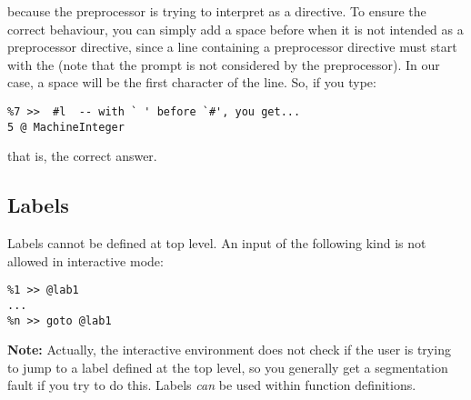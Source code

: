 because the preprocessor is trying to interpret  as a directive.
To ensure the correct behaviour, you can simply add a space before
\ttin{\#} when it is not intended as a preprocessor directive, since a
line containing a preprocessor directive must start with the \ttin{\#}
(note that the prompt is not considered by the preprocessor).  In our
case, a space will be the first character of the line.  So, if you type:

{\small
\begin{verbatim}
%7 >>  #l  -- with ` ' before `#', you get...
5 @ MachineInteger
\end{verbatim}
}
that is, the correct answer.

\subsection{Labels}

Labels cannot be defined at top level. 
An input of the following kind is not allowed in interactive mode:
{\small
\begin{verbatim}
%1 >> @lab1
...
%n >> goto @lab1
\end{verbatim}
}

{\bf Note:} Actually, the interactive environment does not check if the
user is trying to jump to a label defined at the top level, so you
generally get a segmentation fault if you try to do this. Labels
{\em can} be used within function definitions.






